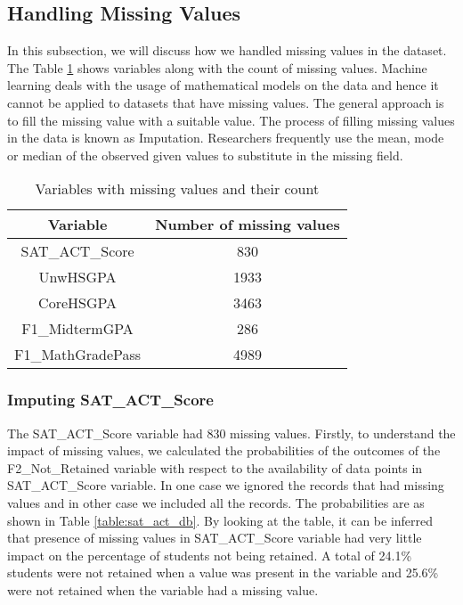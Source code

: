 \documentclass[11pt,openright]{report}
\begin{document}
\subsection {Handling Missing Values}
In this subsection, we will discuss how we handled missing values in the dataset. The Table \ref{table:missing_db} shows variables along with the count of missing values. Machine learning deals with the usage of mathematical models on the data and hence it cannot be applied to datasets that have missing values. The general approach is to fill the missing value with a suitable value. The process of filling missing values in the data is known as Imputation. Researchers frequently use the mean, mode or median of the observed given values to substitute in the missing field.
 \begin{table}[!htb]
	\renewcommand{\arraystretch}{1.3}
	\caption{Variables with missing values and their count}
	\label{table:missing_db}
	\centering
	\begin{tabular}{|c|c|}
		\hline
		\bfseries Variable & \bfseries Number of missing values \\
		\hline
		SAT\_ACT\_Score & 830\\ \hline
		UnwHSGPA & 1933\\ \hline
		CoreHSGPA & 3463\\ \hline
		F1\_MidtermGPA & 286\\ \hline
		F1\_MathGradePass & 4989\\ \hline
	\end{tabular}
\end{table}

\subsubsection {Imputing SAT\_ACT\_Score}
The SAT\_ACT\_Score variable had 830 missing values. Firstly, to understand the impact of missing values, we calculated the probabilities of the outcomes of  the F2\_Not\_Retained variable with respect to the availability of data points in SAT\_ACT\_Score variable. In one case we ignored the records that had missing values and in other case we included all the records. The probabilities are as shown in Table \ref{table:sat_act_db}. By looking at the table, it can be inferred that presence of missing values in SAT\_ACT\_Score variable had very little impact on the percentage of students not being retained. A total of 24.1\% students were not retained when a value was present in the variable and 25.6\% were not retained when the variable had a missing value.
\end{document}
